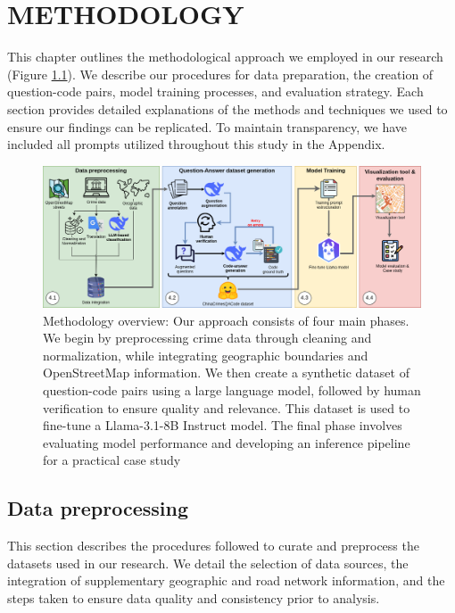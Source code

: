 \chapter{ METHODOLOGY}

\noindent
This chapter outlines the methodological approach we employed in our research (Figure \ref{fig:methodology_overview}). We describe our procedures for data preparation, the creation of question-code pairs, model training processes, and evaluation strategy. Each section provides detailed explanations of the methods and techniques we used to ensure our findings can be replicated. To maintain transparency, we have included all prompts utilized throughout this study in the Appendix.


\begin{figure}[hbtp]
  \centering
  \includegraphics[width=\textwidth]{images/metodologiaExtended.png}
  \captionsetup{justification=raggedright,singlelinecheck=false}
  \caption{Methodology overview: Our approach consists of four main phases. We begin by preprocessing crime data through cleaning and normalization, while integrating geographic boundaries and OpenStreetMap information. We then create a synthetic dataset of question-code pairs using a large language model, followed by human verification to ensure quality and relevance. This dataset is used to fine-tune a Llama-3.1-8B Instruct model. The final phase involves evaluating model performance and developing an inference pipeline for a practical case study}
  \label{fig:methodology_overview}
\end{figure}


\section{Data preprocessing}

\noindent
This section describes the procedures followed to curate and preprocess the datasets used in our research. We detail the selection of data sources, the integration of supplementary geographic and road network information, and the steps taken to ensure data quality and consistency prior to analysis.


